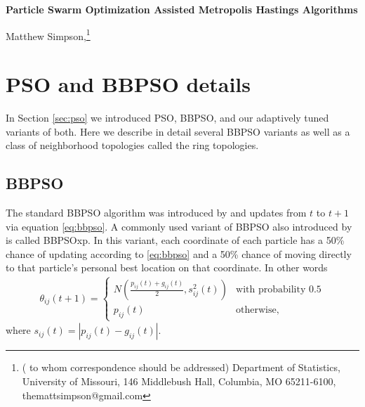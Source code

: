\documentclass[12pt]{article}
\newcommand{\Appendix}
 {%
 \def\thesection{\Alph{section}}
 \def\thesubsection{\Alph{section}.\arabic{subsection}}
 \def\theequation{\Alph{section}.\arabic{equation}}
 \def\thefigure{\Alph{section}.\arabic{figure}}
 \def\thealg{\Alph{section}.\arabic{alg}}
 }
\begin{document}
\thispagestyle{empty} \baselineskip=28pt

\thispagestyle{empty} \baselineskip=28pt

%
\begin{center}
{\LARGE{\bf Particle Swarm Optimization Assisted Metropolis Hastings Algorithms}}
\end{center}


\baselineskip=12pt



\vskip 2mm
\blind
{
  \begin{center}
    Matthew Simpson,\footnote{(\baselineskip=10pt to whom correspondence should be addressed)
      Department of Statistics, University of Missouri,
      146 Middlebush Hall, Columbia, MO 65211-6100, themattsimpson@gmail.com}
  \end{center}
} \fi

\clearpage\pagebreak\newpage {}

\baselineskip=24pt

\Appendix
\section{PSO and BBPSO details}\label{app:psodetail}

In Section \ref{sec:pso} we introduced PSO, BBPSO, and our adaptively tuned variants of both. Here we describe in detail several BBPSO variants as well as a class of neighborhood topologies called the ring topologies.

\subsection{BBPSO}\label{subapp:bbpso}
The standard BBPSO algorithm was introduced by \citet{kennedy2003bare} and updates from $t$ to $t+1$ via equation \eqref{eq:bbpso}. A commonly used variant of BBPSO also introduced by \citet{kennedy2003bare} is called BBPSOxp. In this variant, each coordinate of each particle has a 50\% chance of updating according to \eqref{eq:bbpso} and a 50\% chance of moving directly to that particle's personal best location on that coordinate. In other words
\begin{align}\label{eq:bbpsoxp}
\theta_{ij}(t+1) = \begin{cases} N\left(\frac{p_{ij}(t) + g_{ij}(t)}{2}, s^2_{ij}(t)\right) & \mbox{with probability }0.5\\
p_{ij}(t) &\mbox{otherwise,}\end{cases}
\end{align}
where $s_{ij}(t) = |p_{ij}(t) - g_{ij}(t)|$.
\end{document}
